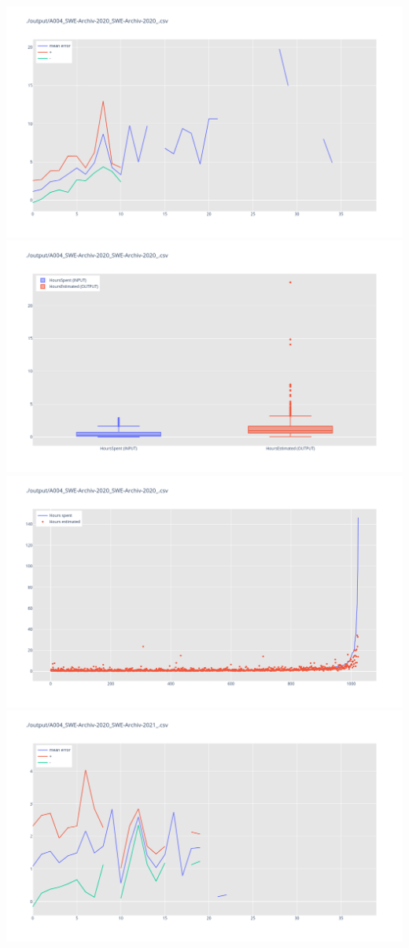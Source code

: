 \includegraphics[width=\textwidth]{Scripts/output/A004_SWE-Archiv-2020_SWE-Archiv-2020_.csv.error_distribution.png}
\includegraphics[width=\textwidth]{Scripts/output/A004_SWE-Archiv-2020_SWE-Archiv-2020_.csv.png}
\includegraphics[width=\textwidth]{Scripts/output/A004_SWE-Archiv-2020_SWE-Archiv-2020_.csv.scatter.png}
\includegraphics[width=\textwidth]{Scripts/output/A004_SWE-Archiv-2020_SWE-Archiv-2021_.csv.error_distribution.png}
